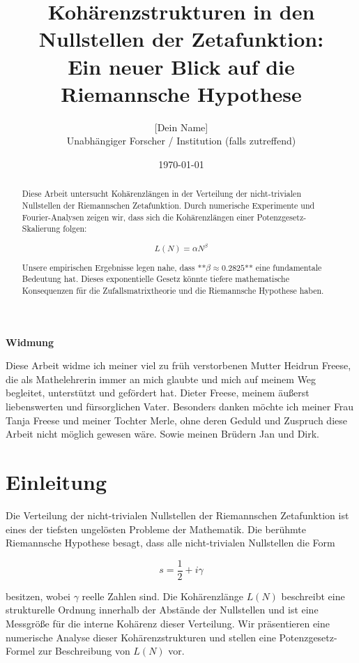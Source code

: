 \documentclass[a4paper,12pt]{article}
\title{\textbf{Kohärenzstrukturen in den Nullstellen der Zetafunktion: \\ Ein neuer Blick auf die Riemannsche Hypothese}}
\author{[Dein Name] \\ \small{Unabhängiger Forscher / Institution (falls zutreffend)}}
\date{\today}
\begin{document}
\maketitle

\begin{center}
\textbf{Widmung}
\end{center}
\vspace{-1em}
\noindent
Diese Arbeit widme ich meiner viel zu früh verstorbenen Mutter Heidrun Freese, die als Mathelehrerin immer an mich glaubte und mich auf meinem Weg begleitet, unterstützt und gefördert hat.  
Dieter Freese, meinem äußerst liebenswerten und fürsorglichen Vater.  
Besonders danken möchte ich meiner Frau Tanja Freese und meiner Tochter Merle, ohne deren Geduld und Zuspruch diese Arbeit nicht möglich gewesen wäre. Sowie meinen Brüdern Jan und Dirk.

\vspace{2em}

\begin{abstract}
Diese Arbeit untersucht Kohärenzlängen in der Verteilung der nicht-trivialen Nullstellen der Riemannschen Zetafunktion. Durch numerische Experimente und Fourier-Analysen zeigen wir, dass sich die Kohärenzlängen einer Potenzgesetz-Skalierung folgen:

\[
L(N) = \alpha N^\beta
\]

Unsere empirischen Ergebnisse legen nahe, dass **\(\beta \approx 0.2825\)** eine fundamentale Bedeutung hat. Dieses exponentielle Gesetz könnte tiefere mathematische Konsequenzen für die Zufallsmatrixtheorie und die Riemannsche Hypothese haben.
\end{abstract}

\section{Einleitung}

Die Verteilung der nicht-trivialen Nullstellen der Riemannschen Zetafunktion ist eines der tiefsten ungelösten Probleme der Mathematik. Die berühmte Riemannsche Hypothese besagt, dass alle nicht-trivialen Nullstellen die Form 

\[
s = \frac{1}{2} + i \gamma
\]

besitzen, wobei \(\gamma\) reelle Zahlen sind.  
Die Kohärenzlänge \(L(N)\) beschreibt eine strukturelle Ordnung innerhalb der Abstände der Nullstellen und ist eine Messgröße für die interne Kohärenz dieser Verteilung. Wir präsentieren eine numerische Analyse dieser Kohärenzstrukturen und stellen eine Potenzgesetz-Formel zur Beschreibung von \(L(N)\) vor.
\end{document}
